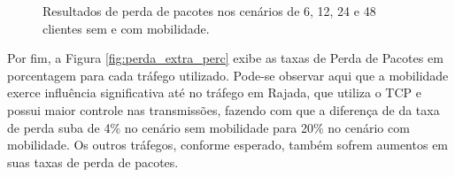 \documentclass[12pt]{article}
\begin{document}
\begin{figure}[!ht]
	\centering
	\caption{Resultados de perda de pacotes nos cenários de 6, 12, 24 e 48 clientes sem e com mobilidade.}
	\label{fig:perda_extra}
\end{figure}

Por fim, a Figura \ref{fig:perda_extra_perc} exibe as taxas de Perda de Pacotes em porcentagem para cada tráfego utilizado. Pode-se observar aqui que a mobilidade exerce influência significativa até no tráfego em Rajada, que utiliza o TCP e possui maior controle nas transmissões, fazendo com que a diferença de da taxa de perda suba de 4\% no cenário sem mobilidade para 20\% no cenário com mobilidade. Os outros tráfegos, conforme esperado, também sofrem aumentos em suas taxas de perda de pacotes.
\end{document}
